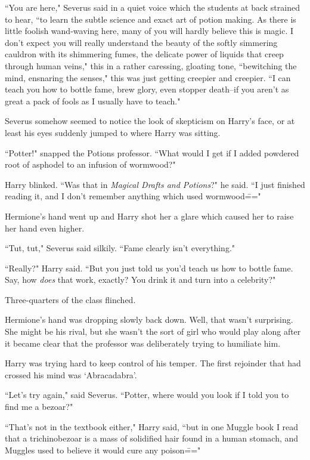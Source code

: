 ``You are here," Severus said in a quiet voice which the students at back strained to hear, ``to learn the subtle science and exact art of potion making. As there is little foolish wand-waving here, many of you will hardly believe this is magic. I don't expect you will really understand the beauty of the softly simmering cauldron with its shimmering fumes, the delicate power of liquids that creep through human veins," this in a rather caressing, gloating tone, ``bewitching the mind, ensnaring the senses," this was just getting creepier and creepier. ``I can teach you how to bottle fame, brew glory, even stopper death\---if you aren't as great a pack of fools as I usually have to teach."

Severus somehow seemed to notice the look of skepticism on Harry's face, or at least his eyes suddenly jumped to where Harry was sitting.

``Potter!" snapped the Potions professor. ``What would I get if I added powdered root of asphodel to an infusion of wormwood?"

Harry blinked. ``Was that in \emph{Magical Drafts and Potions}?" he said. ``I just finished reading it, and I don't remember anything which used wormwood\==="

Hermione's hand went up and Harry shot her a glare which caused her to raise her hand even higher.

``Tut, tut," Severus said silkily. ``Fame clearly isn't everything."

``Really?" Harry said. ``But you just told us you'd teach us how to bottle fame. Say, how \emph{does} that work, exactly? You drink it and turn into a celebrity?"

Three-quarters of the class flinched.

Hermione's hand was dropping slowly back down. Well, that wasn't surprising. She might be his rival, but she wasn't the sort of girl who would play along after it became clear that the professor was deliberately trying to humiliate him.

Harry was trying hard to keep control of his temper. The first rejoinder that had crossed his mind was `Abracadabra'.

``Let's try again," said Severus. ``Potter, where would you look if I told you to find me a bezoar?"

``That's not in the textbook either," Harry said, ``but in one Muggle book I read that a trichinobezoar is a mass of solidified hair found in a human stomach, and Muggles used to believe it would cure any poison\==="

